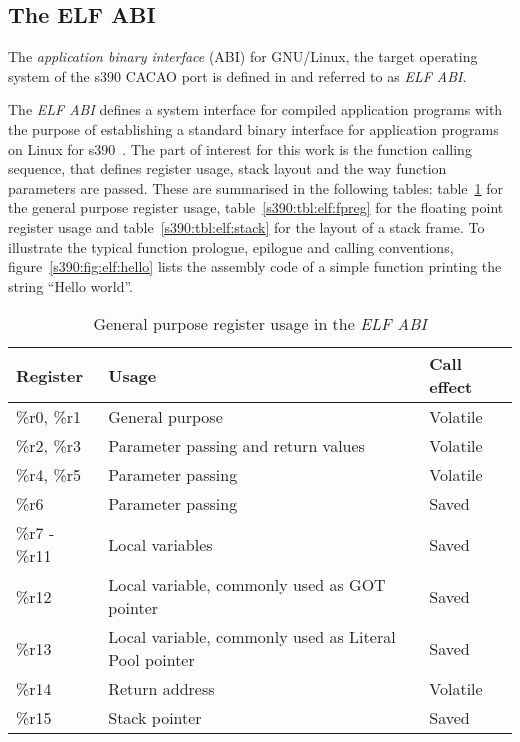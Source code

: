 \subsection{The ELF ABI}

The \emph{application binary interface} (ABI) for GNU/Linux, the target operating system of the s390 CACAO port is defined in \cite{s390:bib:abi} and referred to as \emph{ELF ABI}.

The \emph{ELF ABI} defines a system interface for compiled application programs with the purpose of establishing a standard binary interface for application programs on Linux for s390~\cite{s390:bib:abi}. The part of interest for this work is the function calling sequence, that defines register usage, stack layout and the way function parameters are passed. These are summarised in the following tables: table~\ref{s390:tbl:elf:intreg} for the general purpose register usage, table~\ref{s390:tbl:elf:fpreg} for the floating point register usage and table~\ref{s390:tbl:elf:stack} for the layout of a stack frame. To illustrate the typical function prologue, epilogue and calling conventions, figure~\ref{s390:fig:elf:hello} lists the assembly code of a simple function printing the string ``Hello world''.

\begin{table}
\centering
\begin{tabular}{|l|l|l|}
\hline
Register      & Usage                                                  & Call effect \\
\hline
\%r0, \%r1    & General purpose                                        & Volatile \\
\%r2, \%r3    & Parameter passing and return values                    & Volatile \\
\%r4, \%r5    & Parameter passing                                      & Volatile \\
\%r6          & Parameter passing                                      & Saved \\
\%r7 - \%r11  & Local variables                                        & Saved \\
\%r12         & Local variable, commonly used as GOT pointer           & Saved \\
\%r13         & Local variable, commonly used as Literal Pool pointer  & Saved \\
\%r14         & Return address                                         & Volatile \\
\%r15         & Stack pointer                                          & Saved \\
\hline
\end{tabular}
\caption{General purpose register usage in the \emph{ELF ABI}}
\label{s390:tbl:elf:intreg}
\end{table}

